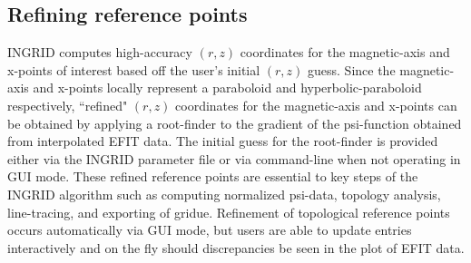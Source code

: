 \subsection{Refining reference points}
 INGRID computes high-accuracy $(r, z)$ coordinates for the magnetic-axis and x-points of interest based off the user's initial $(r, z)$ guess. Since the magnetic-axis and x-points locally represent a paraboloid and hyperbolic-paraboloid respectively, ``refined" $(r, z)$ coordinates for the magnetic-axis and x-points can be obtained by applying a root-finder to the gradient of the psi-function obtained from interpolated EFIT data. The initial guess for the root-finder is provided either via the INGRID parameter file or via command-line when not operating in GUI mode. These refined reference points are essential to key steps of the INGRID algorithm such as computing normalized psi-data, topology analysis, line-tracing, and exporting of gridue. Refinement of topological reference points occurs automatically via GUI mode, but users are able to update entries interactively and on the fly should discrepancies be seen in the plot of EFIT data.
